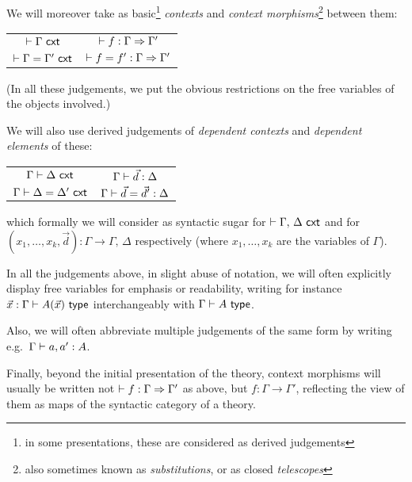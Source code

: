 We will moreover take as basic\footnote{in some presentations, these are considered as derived judgements} \emph{contexts} and \emph{context morphisms}\footnote{also sometimes known as \emph{substitutions}, or as closed \emph{telescopes}} between them:
\begin{center}\begin{tabular}{@{\ }c@{\hskip 0.75in}c@{\ }}
$\vdash \Gamma \ \mathsf{cxt}$ & $ \vdash  f : \Gamma \Rightarrow \Gamma' $  \\ \rule{0pt}{3ex} 
$\vdash \Gamma = \Gamma' \ \mathsf{cxt}$ &  $\vdash { f} = { f}' : \Gamma \Rightarrow \Gamma'$ \\
\end{tabular}
\end{center}

(In all these judgements, we put the obvious restrictions on the free variables of the objects involved.)

We will also use derived judgements of \emph{dependent contexts} and \emph{dependent elements} of these:
\begin{center}\begin{tabular}{@{\ }c@{\hskip 0.75in}c@{\ }}
$ \Gamma \vdash \Delta \ \mathsf{cxt}$ & $\Gamma \vdash \vec d : \Delta $  \\ \rule{0pt}{3ex} 
$ \Gamma \vdash \Delta = \Delta' \ \mathsf{cxt}$ & $\Gamma \vdash \vec d = \vec d' : \Delta$ \\
\end{tabular}
\end{center}
which formally we will consider as syntactic sugar for $\vdash \Gamma,\,\Delta\ \mathsf{cxt}$ and for $ (x_1,\ldots,x_k,\vec d) \colon \Gamma \to \Gamma,\,\Delta$ respectively (where $x_1,\ldots,x_k$ are the variables of $\Gamma$).

In all the judgements above, in slight abuse of notation, we will often explicitly display free variables for emphasis or readability, writing for instance $\vec x : \Gamma \vdash A(\vec x)\ \mathsf{type}$ interchangeably with $\Gamma \vdash A\ \mathsf{type}$.

Also, we will often abbreviate multiple judgements of the same form by writing e.g.\ $\Gamma \vdash a,a' : A$.

Finally, beyond the initial presentation of the theory, context morphisms will usually  be written not $\vdash f : \Gamma \Rightarrow \Gamma'$ as above, but $f \colon \Gamma \to \Gamma'$, reflecting the view of them as maps of the syntactic category of a theory.

